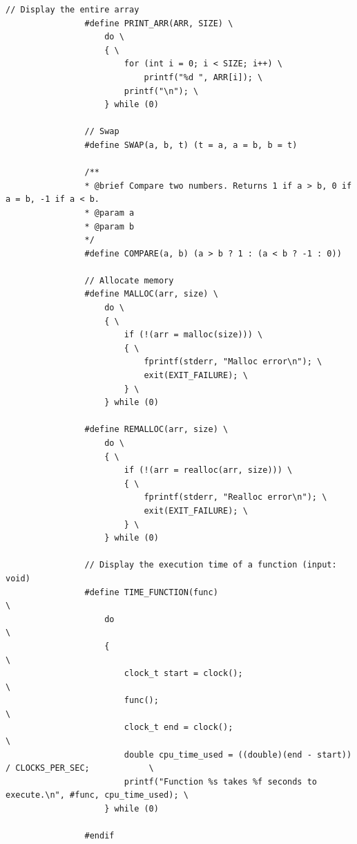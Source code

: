 \documentclass{article}
\begin{document}
\begin{lstlisting}[style=CStyle]
				// Display the entire array
				#define PRINT_ARR(ARR, SIZE) \
					do \
					{ \
						for (int i = 0; i < SIZE; i++) \
							printf("%d ", ARR[i]); \
						printf("\n"); \
					} while (0)

				// Swap
				#define SWAP(a, b, t) (t = a, a = b, b = t)

				/**
				* @brief Compare two numbers. Returns 1 if a > b, 0 if a = b, -1 if a < b.
				* @param a
				* @param b
				*/
				#define COMPARE(a, b) (a > b ? 1 : (a < b ? -1 : 0))

				// Allocate memory
				#define MALLOC(arr, size) \
					do \
					{ \
						if (!(arr = malloc(size))) \
						{ \
							fprintf(stderr, "Malloc error\n"); \
							exit(EXIT_FAILURE); \
						} \
					} while (0)

				#define REMALLOC(arr, size) \
					do \
					{ \
						if (!(arr = realloc(arr, size))) \
						{ \
							fprintf(stderr, "Realloc error\n"); \
							exit(EXIT_FAILURE); \
						} \
					} while (0)

				// Display the execution time of a function (input: void)
				#define TIME_FUNCTION(func)                                                         \
					do                                                                              \
					{                                                                               \
						clock_t start = clock();                                                    \
						func();                                                                     \
						clock_t end = clock();                                                      \
						double cpu_time_used = ((double)(end - start)) / CLOCKS_PER_SEC;            \
						printf("Function %s takes %f seconds to execute.\n", #func, cpu_time_used); \
					} while (0)

				#endif

			\end{lstlisting}
\end{document}
